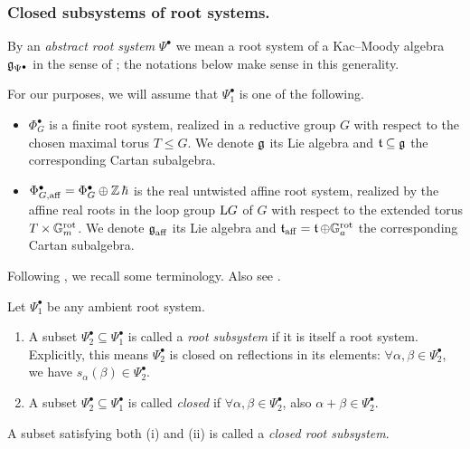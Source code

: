 \subsubsection{Closed subsystems of root systems.}

By an \emph{abstract root system} $\Psi^{\bullet}$ we mean a root system of a Kac--Moody algebra $\operatorname{\mathfrak{g}}_{\Psi^{\bullet}}$ in the sense of \cite{Kac83}; the notations below make sense in this generality.

\begin{setup}\label{setup: finite and affine root systems}
For our purposes, we will assume that $\Psi^{\bullet}_1$ is one of the following.
\begin{itemize}
    \item[(i)] $\Phi^{\bullet}_G$ is a finite root system, realized in a reductive group $G$ with respect to the chosen maximal torus $T \leq G$. We denote $\operatorname{\mathfrak{g}}$ its Lie algebra and $\operatorname{\mathfrak{t}} \subseteq \operatorname{\mathfrak{g}}$ the corresponding Cartan subalgebra.
    \item[(ii)] $\Phi^{\bullet}_{G, \mathrm{aff}} = \Phi^{\bullet}_G \oplus \operatorname{\mathbb{Z}}\hbar$ is the real untwisted affine root system, realized by the affine real roots in the loop group $\mathrm{L} G$ of $G$ with respect to the extended torus $T \times \mathbb{G}_m^{\mathrm{rot}}$. We denote $\operatorname{\mathfrak{g}}_{\mathrm{aff}}$ its Lie algebra and $\operatorname{\mathfrak{t}}_{\mathrm{aff}} = \operatorname{\mathfrak{t}} \oplus \mathbb{G}_a^{\mathrm{rot}}$ the corresponding Cartan subalgebra.
\end{itemize}
\end{setup}

Following \cite[Definition 2.4.1]{RV19}, we recall some terminology. Also see \cite[\S 1.2]{DL11a}.
\begin{notation}\label{notation: closed root subsystems}
Let $\Psi^{\bullet}_1$ be any ambient root system.
\begin{enumerate}
\item[(i)] 
A subset $\Psi^{\bullet}_2 \subseteq \Psi^{\bullet}_1$ is called a \emph{root subsystem} if it is itself a root system. 
Explicitly, this means $\Psi^{\bullet}_2$ is closed on reflections in its elements: $\forall \alpha, \beta \in \Psi^{\bullet}_2$, we have $s_{\alpha}(\beta) \in \Psi^{\bullet}_2$.
%
\item[(ii)] 
A subset $\Psi^{\bullet}_2 \subseteq \Psi^{\bullet}_1$ is called \emph{closed} if $\forall \alpha, \beta \in \Psi^{\bullet}_2$, also $ \alpha + \beta \in \Psi^{\bullet}_2$.
\end{enumerate}
A subset satisfying both (i) and (ii) is called a \emph{closed root subsystem}.
\end{notation}



